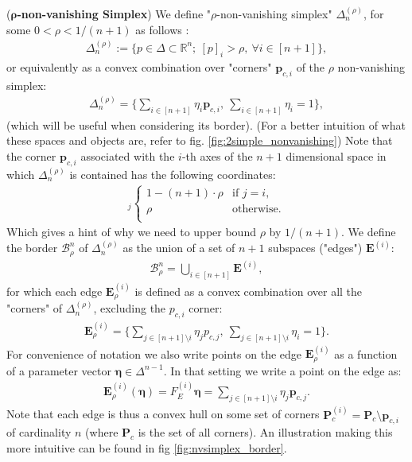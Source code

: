 \begin{definition}
    \label{def:rho_non_vanishing_simplex}
    (\textbf{$\bm{\rho}$-non-vanishing Simplex}) We define "$\rho$-non-vanishing simplex" $\Delta^{(\rho)}_n$, for some $0 < \rho < 1/(n+1)$ as follows : 
    \begin{align*}
        \Delta^{(\rho)}_n := \Big\{ p \in \Delta \subset \mathbb{R}^n;~ [p]_i > \rho, ~ \forall i \in [n+1] \Big\},
    \end{align*}
    or equivalently as a convex combination over "corners" $\bm{p}_{c,i}$ of the $\rho$ non-vanishing simplex:
    \begin{align*}
        \Delta^{(\rho)}_n = \Big\{ \sum_{i\in [n+1]} \eta_i \bm{p}_{c,i},~ \sum_{i \in [n+1]} \eta_i = 1 \},
    \end{align*}
    (which will be useful when considering its border). (For a better intuition of what these spaces and objects are, refer to fig. \ref{fig:2simple_nonvanishing}) Note that the corner $\bm{p}_{c,i}$ associated with the $i$-th axes of the $n+1$ dimensional space in which $\Delta^{(\rho)}_n$ is contained has the following coordinates:
    \begin{align*}
        [\bm{p}_{c,i}]_j \begin{cases}
            1-(n+1)\cdot \rho & \text{if } j=i,\\
            \rho & \text{otherwise.}\\
        \end{cases}
    \end{align*}
    Which gives a hint of why we need to upper bound $\rho$ by $1/(n+1)$. We define the border $\mathcal{B}^n_\rho$ of $\Delta^{(\rho)}_n$ as the union of a set of $n+1$ subspaces ("edges") $\bm{E}^{(i)}$:
    \begin{align*}
        \mathcal{B}^n_\rho = \bigcup_{i\in [n+1]} \bm{E}^{(i)},
    \end{align*}
    for which each edge $\bm{E}^{(i)}_\rho$ is defined as a convex combination over all the "corners" of $\Delta^{(\rho)}_n$, excluding the $p_{c,i}$ corner:
    \begin{align*}
        \bm{E}^{(i)}_\rho = \Big\{ \sum_{j \in [n+1]\setminus i} \eta_j p_{c,j},~ \sum_{j \in [n+1]\setminus i} \eta_i = 1 \}.
    \end{align*}
    For convenience of notation we also write points on the edge $\bm{E}^{(i)}_\rho$ as a function of a parameter vector $\bm{\eta} \in \Delta^{n-1}$. In that setting we write a point on the edge as: 
    \begin{align*}
        \bm{E}^{(i)}_\rho(\bm{\eta}) = F^{(i)}_E \bm{\eta} = \sum_{j \in [n+1] \setminus i} \eta_j \bm{p}_{c,j}.
    \end{align*}
    Note that each edge is thus a convex hull on some set of corners $\bm{P}_c^{(i)} = \bm{P}_c \setminus \bm{p}_{c,i}$ of cardinality $n$ (where $\bm{P}_c$ is the set of all corners). An illustration making this more intuitive can be found in fig \ref{fig:nvsimplex_border}.
\end{definition}

